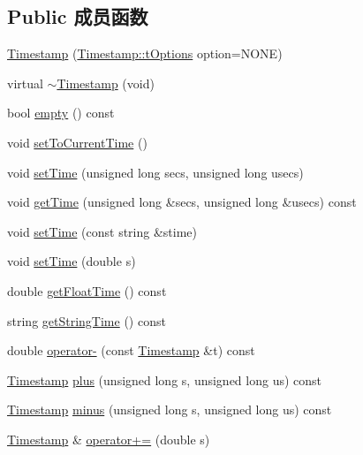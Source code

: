 \subsection*{Public 成员函数}
\begin{DoxyCompactItemize}
\item 
\hyperlink{classDUtils_1_1Timestamp_a7edd67789d60b27acbee7f591ed3e2da}{Timestamp} (\hyperlink{classDUtils_1_1Timestamp_a5a8a3cb7f9e0f73bf11fce42688b06c8}{Timestamp\-::t\-Options} option=N\-O\-N\-E)
\item 
virtual \hyperlink{classDUtils_1_1Timestamp_a06ea20fe67d9e7177818ba219ea3137f}{$\sim$\-Timestamp} (void)
\item 
bool \hyperlink{classDUtils_1_1Timestamp_a9d088f9c5750c4f4cd688ab74a93aba9}{empty} () const 
\item 
void \hyperlink{classDUtils_1_1Timestamp_ae27c920f3833c104096213c6fb17f4d8}{set\-To\-Current\-Time} ()
\item 
void \hyperlink{classDUtils_1_1Timestamp_a439bcff577f3ae30e8918897ecb33e76}{set\-Time} (unsigned long secs, unsigned long usecs)
\item 
void \hyperlink{classDUtils_1_1Timestamp_af28ca416f5960805b7a517c11df7d3c6}{get\-Time} (unsigned long \&secs, unsigned long \&usecs) const 
\item 
void \hyperlink{classDUtils_1_1Timestamp_ac35ad9d35e9ce5ff6fea159e9b060bf0}{set\-Time} (const string \&stime)
\item 
void \hyperlink{classDUtils_1_1Timestamp_a797856da2823ee26814151ea97aea5e1}{set\-Time} (double s)
\item 
double \hyperlink{classDUtils_1_1Timestamp_a6830126c3f35278345791148a80a5b86}{get\-Float\-Time} () const 
\item 
string \hyperlink{classDUtils_1_1Timestamp_a220061d59c9a09c6b2932988e4fd6a71}{get\-String\-Time} () const 
\item 
double \hyperlink{classDUtils_1_1Timestamp_a8348340ebdcfeb920fba33dda391443f}{operator-\/} (const \hyperlink{classDUtils_1_1Timestamp}{Timestamp} \&t) const 
\item 
\hyperlink{classDUtils_1_1Timestamp}{Timestamp} \hyperlink{classDUtils_1_1Timestamp_a2d0c2b2ce65c0562db26ad37a304f2c5}{plus} (unsigned long s, unsigned long us) const 
\item 
\hyperlink{classDUtils_1_1Timestamp}{Timestamp} \hyperlink{classDUtils_1_1Timestamp_a53062c2f168d6f584541981b8db3051f}{minus} (unsigned long s, unsigned long us) const 
\item 
\hyperlink{classDUtils_1_1Timestamp}{Timestamp} \& \hyperlink{classDUtils_1_1Timestamp_a609bb289c3833fd6c26c9ee831074a11}{operator+=} (double s)

\end{DoxyCompactItemize}
